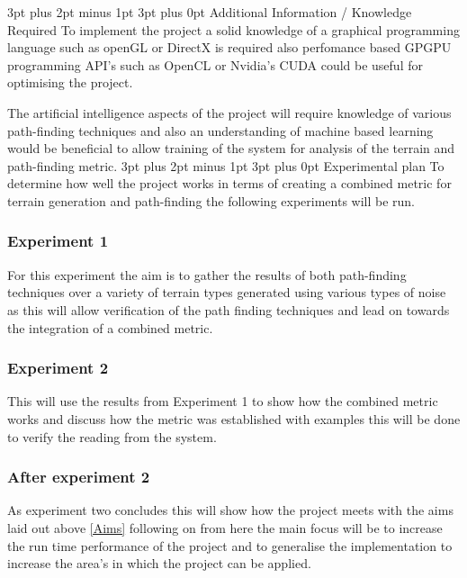 \documentclass[12pt,a4paper]{article}
\makeatletter
\renewcommand\subsection{\@startsection {subsection}{1}{2mm} %
                               {3pt plus 2pt minus 1pt} %
                               {3pt plus 0pt} %
                               {\normalfont\bfseries}}
\makeatother
\begin{document}
\subsection{Additional Information / Knowledge Required}
To implement the project a solid knowledge of a graphical programming language such as openGL or DirectX is required also perfomance based GPGPU programming API's  such as OpenCL or Nvidia's CUDA could be useful for optimising the project.

The artificial intelligence aspects of the project will require knowledge of various path-finding techniques and also an understanding of machine based learning would be beneficial to allow training of the system for analysis of the terrain and path-finding metric.   
\subsection{Experimental plan}
To determine how well the project works in terms of creating a combined metric for terrain generation and path-finding the following experiments will be run.

\subsubsection{Experiment 1}
For this experiment the aim is to gather the results of both path-finding techniques over a variety of terrain types generated using various types of noise as this will allow verification of the path finding techniques and lead on towards the integration of a combined metric. 

\subsubsection{Experiment 2}
This will use the results from Experiment 1 to show how the combined metric works and discuss how the metric was established with examples this will be done to verify the reading from the system.

\subsubsection{After experiment 2} 
As experiment two concludes this will show how the project meets with the aims laid out above \ref{Aims} following on from here the main focus will be to increase the run time performance of the project and to generalise the implementation to increase the area's in which the project can be applied. 
\end{document}

